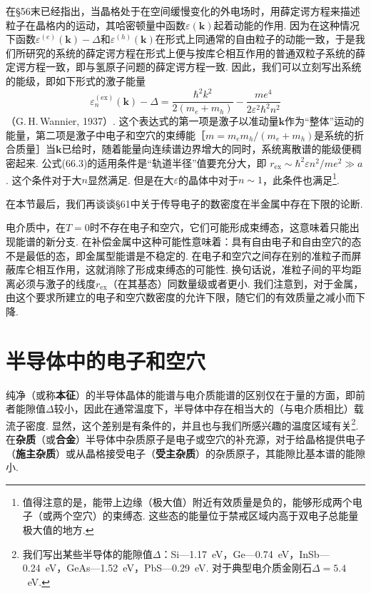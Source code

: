 在§56末已经指出，当晶格处于在空间缓慢变化的外电场时，用薛定谔方程来描述粒子在晶格内的运动，其哈密顿量中函数$\varepsilon(\bm{k})$起着动能的作用. 因为在这种情况下函数$\varepsilon^{(e)}(\bm{k})-\Delta$和$\varepsilon^{(h)}(\bm{k})$在形式上同通常的自由粒子的动能一致，于是我们所研究的系统的薛定谔方程在形式上便与按库仑相互作用的普通双粒子系统的薛定谔方程一致，即与氢原子问题的薛定谔方程一致. 因此，我们可以立刻写出系统的能级，即如下形式的激子能量
\begin{equation}
\varepsilon^{(\mathrm{ex})}_n(\bm{k})-\Delta
=\frac{\hbar^2k^2}{2(m_e+m_h)}
-\frac{me^4}{2\varepsilon^2\hbar^2n^2}
\end{equation}
（G.\,H.\,Wannier, 1937）. 这个表达式的第一项是激子以准动量$\bm{k}$作为“整体”运动的能量，第二项是激子中电子和空穴的束缚能［$m=m_em_h/(m_e+m_h)$是系统的折合质量］当$\bm{k}$已给时，随着能量向连续谱边界增大的同时，系统离散谱的能级便稠密起来. 公式(66.3)的适用条件是“轨道半径”值要充分大，即
$r_{\mathrm{ex}}\sim\hbar^2\varepsilon n^2/me^2\gg a$. 这个条件对于大$n$显然满足. 但是在大$\varepsilon$的晶体中对于$n\sim1$，此条件也满足\footnote{值得注意的是，能带上边缘（极大值）附近有效质量是负的，能够形成两个电子（或两个空穴）的束缚态. 这些态的能量位于禁戒区域内高于双电子总能量极大值的地方.}.

在本节最后，我们再谈谈§61中关于传导电子的数密度在半金属中存在下限的论断.

电介质中，在$T=0$时不存在电子和空穴，它们可能形成束缚态，这意味着只能出现能谱的新分支. 在补偿金属中这种可能性意味着：具有自由电子和自由空穴的态不是最低的态，即金属型能谱是不稳定的. 在电子和空穴之间存在别的准粒子而屏蔽库仑相互作用，这就消除了形成束缚态的可能性. 换句话说，准粒子间的平均距离必须与激子的线度$r_{\mathrm{ex}}$（在其基态）同数量级或者更小. 我们注意到，对于金属，由这个要求所建立的电子和空穴数密度的允许下限，随它们的有效质量之减小而下降.

\section{半导体中的电子和空穴}

纯净（或称\textbf{本征}）的半导体晶体的能谱与电介质能谱的区别仅在于量的方面，即前者能隙值$\Delta$较小，因此在通常温度下，半导体中存在相当大的（与电介质相比）载流子密度. 显然，这个差别是有条件的，并且也与我们所感兴趣的温度区域有关\footnote{我们写出某些半导体的能隙值$\Delta$：Si—1.17~eV，Ge—0.74~eV，InSb—0.24~eV，GeAs—1.52~eV，PbS—0.29~eV. 对于典型电介质金刚石$\Delta=5.4$~eV.}. 在\textbf{杂质}（或\textbf{合金}）半导体中杂质原子是电子或空穴的补充源，对于给晶格提供电子（\textbf{施主杂质}）或从晶格接受电子（\textbf{受主杂质}）的杂质原子，其能隙比基本谱的能隙小.


